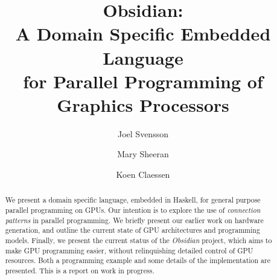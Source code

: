 \documentclass[10pt]{llncs}
\begin{document}
\title{Obsidian:\\A Domain Specific Embedded Language\\for Parallel Programming of Graphics Processors}
       

\author{Joel Svensson \and Mary Sheeran \and Koen Claessen}

\date{}
\maketitle
\begin{abstract}

We present a domain specific language, embedded in Haskell, for general
purpose parallel programming on GPUs. Our intention is to explore the use of
{\em connection patterns} in parallel programming. We briefly present our
earlier work on hardware generation, and outline the current state of GPU
architectures and programming models. Finally, we present the current status
of the {\em Obsidian} project, which aims to make GPU programming easier,
without relinquishing detailed control of GPU resources. Both a programming
example and some details of the implementation are presented. This is a
report on work in progress.

\end{abstract}









\end{document}
